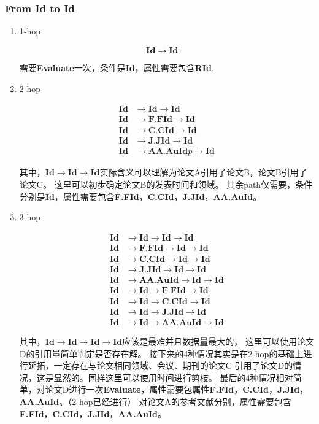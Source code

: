 \documentclass[hyperref,UTF8]{ctexart}
\theoremstyle{definition}
\theoremstyle{remark}
\numberwithin{equation}{subsection}
\newcommand{\Emph}{\textbf}
\newcommand{\resetcounter}{\setcounter{equation}{0}}
\newcommand{\Evaluate}{\Emph{Evaluate}}
\newcommand{\Id}{\Emph{Id}}
\newcommand{\RId}{\Emph{RId}}
\newcommand{\FFId}{\Emph{F.FId}}
\newcommand{\CCId}{\Emph{C.CId}}
\newcommand{\JJId}{\Emph{J.JId}}
\newcommand{\AAAuId}{\Emph{AA.AuId}}
\begin{document}
\subsubsection{From \Emph{Id} to \Emph{Id}}
\label{subsub:Id2Id}	

	\begin{enumerate}[(1)]
		
		\item 1-hop
		
		\begin{align}
		\resetcounter
			\Id &\rightarrow \Id
		\end{align}
		需要\Evaluate 一次，条件是\Id ，属性需要包含\RId.
		
		\item 2-hop
		
		\begin{align}
			\Id &\rightarrow \Id \rightarrow \Id	\\
			\Id &\rightarrow \FFId \rightarrow \Id	\\
			\Id &\rightarrow \CCId \rightarrow \Id	\\
			\Id &\rightarrow \JJId \rightarrow \Id	\\
			\Id &\rightarrow \AAAuId p\rightarrow \Id
		\end{align}
		
		其中，$\Id \rightarrow \Id \rightarrow \Id$实际含义可以理解为论文A引用了论文B，论文B引用了论文C。
		这里可以初步确定论文B的发表时间和领域。
		其余path仅需要，条件分别是\Id，属性需要包含\FFId，\CCId，\JJId，\AAAuId。
		
		\item 3-hop
		
		\begin{align}
			\Id &\rightarrow \Id 	\rightarrow 	\Id	\rightarrow \Id	\\
			\Id &\rightarrow \FFId 	\rightarrow 	\Id	\rightarrow \Id	\\
			\Id &\rightarrow \CCId 	\rightarrow 	\Id	\rightarrow \Id	\\
			\Id &\rightarrow \JJId 	\rightarrow 	\Id	\rightarrow \Id	\\
			\Id &\rightarrow \AAAuId \rightarrow 	\Id	\rightarrow \Id	\\
			\Id &\rightarrow \Id 	\rightarrow	\FFId \rightarrow \Id	\\
			\Id &\rightarrow \Id 	\rightarrow	\CCId \rightarrow \Id	\\
			\Id &\rightarrow \Id 	\rightarrow	\JJId \rightarrow \Id	\\
			\Id &\rightarrow \Id 	\rightarrow	\AAAuId \rightarrow \Id
		\end{align}
		
		其中，$\Id \rightarrow \Id \rightarrow \Id \rightarrow \Id$应该是最难并且数据量最大的，
		这里可以使用论文D的引用量简单判定是否存在解。
		接下来的4种情况其实是在2-hop的基础上进行延拓，一定存在与论文相同领域、会议、期刊的论文C
		引用了论文D的情况，这是显然的。同样这里可以使用时间进行剪枝。
		最后的4种情况相对简单，对论文D进行一次\Evaluate，属性需要包属性\FFId，\CCId，\JJId，\AAAuId。（2-hop已经进行）
		对论文A的参考文献分别，属性需要包含\FFId，\CCId，\JJId，\AAAuId。
		
	\end{enumerate}
	
\end{document}
